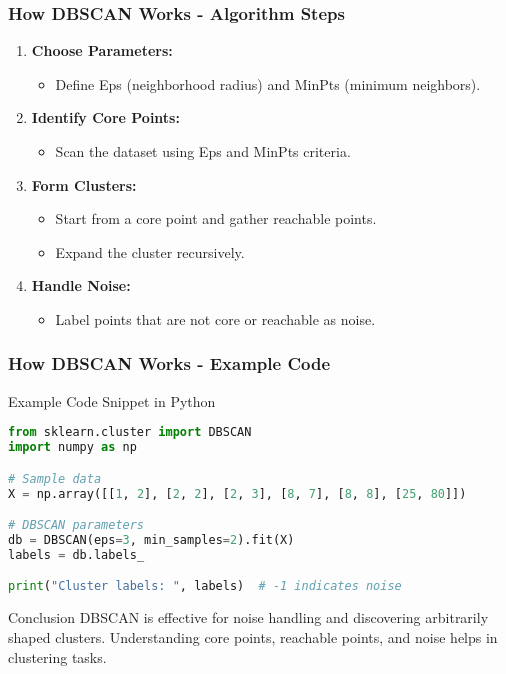 \documentclass[aspectratio=169]{beamer}
\begin{document}
\begin{frame}[fragile]
    \frametitle{How DBSCAN Works - Algorithm Steps}
    
    \begin{enumerate}
        \item \textbf{Choose Parameters:}
        \begin{itemize}
            \item Define Eps (neighborhood radius) and MinPts (minimum neighbors).
        \end{itemize}
        
        \item \textbf{Identify Core Points:}
        \begin{itemize}
            \item Scan the dataset using Eps and MinPts criteria.
        \end{itemize}
        
        \item \textbf{Form Clusters:}
        \begin{itemize}
            \item Start from a core point and gather reachable points.
            \item Expand the cluster recursively.
        \end{itemize}
        
        \item \textbf{Handle Noise:}
        \begin{itemize}
            \item Label points that are not core or reachable as noise.
        \end{itemize}
    \end{enumerate}
\end{frame}

\begin{frame}[fragile]
    \frametitle{How DBSCAN Works - Example Code}
    
    \begin{block}{Example Code Snippet in Python}
    \begin{lstlisting}[language=Python]
from sklearn.cluster import DBSCAN
import numpy as np

# Sample data
X = np.array([[1, 2], [2, 2], [2, 3], [8, 7], [8, 8], [25, 80]])

# DBSCAN parameters
db = DBSCAN(eps=3, min_samples=2).fit(X)
labels = db.labels_

print("Cluster labels: ", labels)  # -1 indicates noise
    \end{lstlisting}
    \end{block}
    
    \begin{block}{Conclusion}
        DBSCAN is effective for noise handling and discovering arbitrarily shaped clusters. Understanding core points, reachable points, and noise helps in clustering tasks.
    \end{block}
\end{frame}
\end{document}
